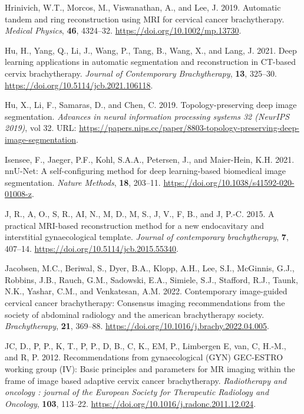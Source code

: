 \documentclass[
  11pt,
]{article}
\newlength{\cslhangindent}
\newenvironment{CSLReferences}[2] %
 {\begin{list}{}{%
  \setlength{\itemindent}{0pt}
  \setlength{\leftmargin}{0pt}
  \setlength{\parsep}{0pt}
  \ifodd #1
   \setlength{\leftmargin}{\cslhangindent}
   \setlength{\itemindent}{-1\cslhangindent}
  \fi
  \setlength{\itemsep}{#2\baselineskip}}}
 {\end{list}}
\begin{document}
\begin{CSLReferences}{1}{1}
Hrinivich, W.T., Morcos, M., Viswanathan, A., and Lee, J. 2019.
Automatic tandem and ring reconstruction using {MRI} for cervical cancer
brachytherapy. \emph{Medical Physics}, \textbf{46}, 4324--32.
\url{https://doi.org/10.1002/mp.13730}.

Hu, H., Yang, Q., Li, J., Wang, P., Tang, B., Wang, X., and Lang, J.
2021. Deep learning applications in automatic segmentation and
reconstruction in {CT}-based cervix brachytherapy. \emph{Journal of
Contemporary Brachytherapy}, \textbf{13}, 325--30.
\url{https://doi.org/10.5114/jcb.2021.106118}.

Hu, X., Li, F., Samaras, D., and Chen, C. 2019. Topology-preserving deep
image segmentation. \emph{Advances in neural information processing
systems 32 (NeurIPS 2019)}, vol 32. URL:
\url{https://papers.nips.cc/paper/8803-topology-preserving-deep-image-segmentation}.

Isensee, F., Jaeger, P.F., Kohl, S.A.A., Petersen, J., and Maier-Hein,
K.H. 2021. {nnU-Net}: A self-configuring method for deep learning-based
biomedical image segmentation. \emph{Nature Methods}, \textbf{18},
203--11. \url{https://doi.org/10.1038/s41592-020-01008-z}.

J, R., A, O., S, R., AI, N., M, D., M, S., J, V., F, B., and J, P.-C.
2015. A practical MRI-based reconstruction method for a new endocavitary
and interstitial gynaecological template. \emph{Journal of contemporary
brachytherapy}, \textbf{7}, 407--14.
\url{https://doi.org/10.5114/jcb.2015.55340}.

Jacobsen, M.C., Beriwal, S., Dyer, B.A., Klopp, A.H., Lee, S.I.,
McGinnis, G.J., Robbins, J.B., Rauch, G.M., Sadowski, E.A., Simiele,
S.J., Stafford, R.J., Taunk, N.K., Yashar, C.M., and Venkatesan, A.M.
2022. Contemporary image-guided cervical cancer brachytherapy: Consensus
imaging recommendations from the society of abdominal radiology and the
american brachytherapy society. \emph{Brachytherapy}, \textbf{21},
369--88. \url{https://doi.org/10.1016/j.brachy.2022.04.005}.

JC, D., P, P., K, T., P, P., D, B., C, K., EM, P., Limbergen E, van, C,
H.-M., and R, P. 2012. Recommendations from gynaecological (GYN)
GEC-ESTRO working group (IV): Basic principles and parameters for MR
imaging within the frame of image based adaptive cervix cancer
brachytherapy. \emph{Radiotherapy and oncology : journal of the European
Society for Therapeutic Radiology and Oncology}, \textbf{103}, 113--22.
\url{https://doi.org/10.1016/j.radonc.2011.12.024}.


\end{CSLReferences}
\end{document}
